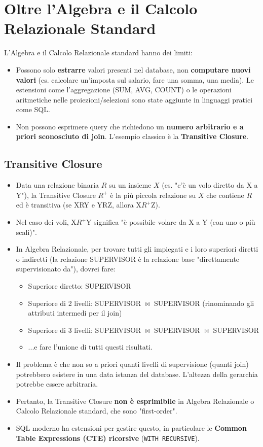 \documentclass{article}
\newcommand{\naturaljoin}{\Join}
\begin{document}
	\section{Oltre l'Algebra e il Calcolo Relazionale Standard}
	
	L'Algebra e il Calcolo Relazionale standard hanno dei limiti:
	\begin{itemize}
		\item Possono solo \textbf{estrarre} valori presenti nel database, non \textbf{computare nuovi valori} (es. calcolare un'imposta sul salario, fare una somma, una media). Le estensioni come l'aggregazione (SUM, AVG, COUNT) o le operazioni aritmetiche nelle proiezioni/selezioni sono state aggiunte in linguaggi pratici come SQL.
		\item Non possono esprimere query che richiedono un \textbf{numero arbitrario e a priori sconosciuto di join}. L'esempio classico è la \textbf{Transitive Closure}.
	\end{itemize}
	
	\subsection{Transitive Closure}
	\begin{itemize}
		\item Data una relazione binaria $R$ su un insieme $X$ (es. "c'è un volo diretto da X a Y"), la Transitive Closure $R^+$ è la più piccola relazione su $X$ che contiene $R$ ed è transitiva (se XRY e YRZ, allora X$R^+$Z).
		\item Nel caso dei voli, X$R^+$Y significa "è possibile volare da X a Y (con uno o più scali)".
		\item In Algebra Relazionale, per trovare tutti gli impiegati e i loro superiori diretti o indiretti (la relazione SUPERVISOR è la relazione base "direttamente supervisionato da"), dovrei fare:
		\begin{itemize}
			\item Superiore diretto: SUPERVISOR
			\item Superiore di 2 livelli: SUPERVISOR $\naturaljoin$ SUPERVISOR (rinominando gli attributi intermedi per il join)
			\item Superiore di 3 livelli: SUPERVISOR $\naturaljoin$ SUPERVISOR $\naturaljoin$ SUPERVISOR
			\item ...e fare l'unione di tutti questi risultati.
		\end{itemize}
		\item Il problema è che non so a priori quanti livelli di supervisione (quanti join) potrebbero esistere in una data istanza del database. L'altezza della gerarchia potrebbe essere arbitraria.
		\item Pertanto, la Transitive Closure \textbf{non è esprimibile} in Algebra Relazionale o Calcolo Relazionale standard, che sono "first-order".
		\item SQL moderno ha estensioni per gestire questo, in particolare le \textbf{Common Table Expressions (CTE) ricorsive} (\texttt{WITH RECURSIVE}).
	\end{itemize}
	
\end{document}
